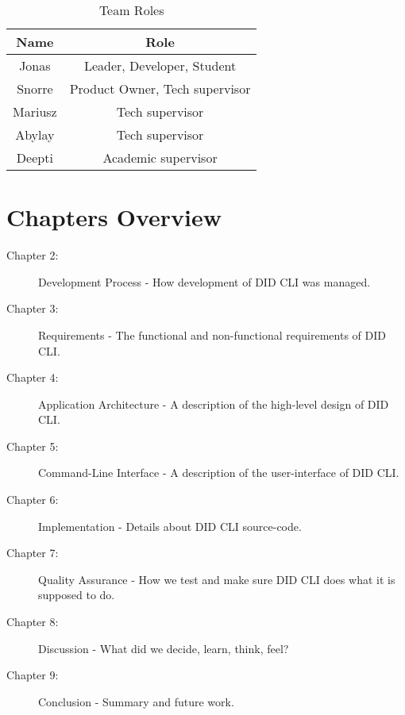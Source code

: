 \begin{table}
  \centering
  \caption{Team Roles}
  \label{tab:example1}
  \begin{tabular}{cc}
    \hline
    Name  & Role \\
    \hline
    Jonas       & Leader, Developer, Student         \\
    Snorre      & Product Owner, Tech supervisor \\
    Mariusz     & Tech supervisor \\
    Abylay      & Tech supervisor \\
    Deepti      & Academic supervisor \\
    \hline
  \end{tabular}
\end{table}



\newpage

\section{Chapters Overview}

\begin{description}
    \item[Chapter 2:] Development Process - How development of DID CLI was managed.
    \item[Chapter 3:] Requirements - The functional and non-functional requirements of DID CLI.
    \item[Chapter 4:] Application Architecture - A description of the high-level design of DID CLI.
    \item[Chapter 5:] Command-Line Interface - A description of the user-interface of DID CLI.
    \item[Chapter 6:] Implementation - Details about DID CLI source-code.
    \item[Chapter 7:] Quality Assurance - How we test and make sure DID CLI does what it is supposed to do. 
    \item[Chapter 8:] Discussion - What did we decide, learn, think, feel?
    \item[Chapter 9:] Conclusion - Summary and future work.
\end{description}
